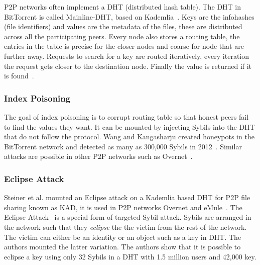 P2P networks often implement a DHT (distributed hash table). The DHT in
BitTorrent is called Mainline-DHT, based on
Kademlia~\cite{maymounkov2002kademlia}. Keys are the infohashes (file
identifiers) and values are the metadata of the files, these are distributed
across all the participating peers. Every node also stores a routing table, the
entries in the table is precise for the closer nodes and coarse for node that
are further away. Requests to search for a key are routed iteratively, every
iteration the request gets closer to the destination node. Finally the value is
returned if it is found~\cite{bep5}.

\subsubsection{Index Poisoning}
\label{sec:index-poisoning}
The goal of index poisoning is to corrupt routing table so that
honest peers fail to find the values they want. It can be mounted by injecting
Sybils into the DHT that do not follow the protocol. Wang and Kangasharju
created honeypots in the BitTorrent network and detected as many as 300,000
Sybils in 2012~\cite{wang2012real}. Similar attacks are possible in other P2P networks
such as Overnet~\cite{liang2006index}.




\subsubsection{Eclipse Attack}
Steiner et al. mounted an Eclipse attack on a Kademlia based DHT for P2P file
sharing known as KAD, it is used in P2P networks Overnet and
eMule~\cite{steiner2007exploiting}. The Eclipse Attack~\cite{singh2006eclipse}
is a special form of targeted Sybil attack. Sybils are arranged in the network
such that they \emph{eclipse} the the victim from the rest of the network. The
victim can either be an identity or an object such as a key in DHT. The authors
mounted the latter variation. The authors show that it is possible to eclipse a
key using only 32 Sybils in a DHT with 1.5 million users and 42,000 key.

